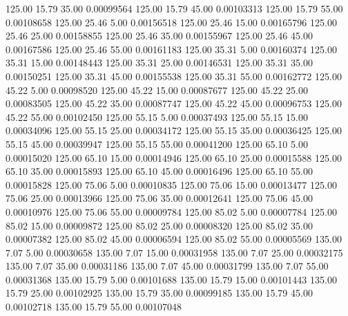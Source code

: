     125.00     15.79     35.00     0.00099564
    125.00     15.79     45.00     0.00103313
    125.00     15.79     55.00     0.00108658
    125.00     25.46      5.00     0.00156518
    125.00     25.46     15.00     0.00165796
    125.00     25.46     25.00     0.00158855
    125.00     25.46     35.00     0.00155967
    125.00     25.46     45.00     0.00167586
    125.00     25.46     55.00     0.00161183
    125.00     35.31      5.00     0.00160374
    125.00     35.31     15.00     0.00148443
    125.00     35.31     25.00     0.00146531
    125.00     35.31     35.00     0.00150251
    125.00     35.31     45.00     0.00155538
    125.00     35.31     55.00     0.00162772
    125.00     45.22      5.00     0.00098520
    125.00     45.22     15.00     0.00087677
    125.00     45.22     25.00     0.00083505
    125.00     45.22     35.00     0.00087747
    125.00     45.22     45.00     0.00096753
    125.00     45.22     55.00     0.00102450
    125.00     55.15      5.00     0.00037493
    125.00     55.15     15.00     0.00034096
    125.00     55.15     25.00     0.00034172
    125.00     55.15     35.00     0.00036425
    125.00     55.15     45.00     0.00039947
    125.00     55.15     55.00     0.00041200
    125.00     65.10      5.00     0.00015020
    125.00     65.10     15.00     0.00014946
    125.00     65.10     25.00     0.00015588
    125.00     65.10     35.00     0.00015893
    125.00     65.10     45.00     0.00016496
    125.00     65.10     55.00     0.00015828
    125.00     75.06      5.00     0.00010835
    125.00     75.06     15.00     0.00013477
    125.00     75.06     25.00     0.00013966
    125.00     75.06     35.00     0.00012641
    125.00     75.06     45.00     0.00010976
    125.00     75.06     55.00     0.00009784
    125.00     85.02      5.00     0.00007784
    125.00     85.02     15.00     0.00009872
    125.00     85.02     25.00     0.00008320
    125.00     85.02     35.00     0.00007382
    125.00     85.02     45.00     0.00006594
    125.00     85.02     55.00     0.00005569
    135.00      7.07      5.00     0.00030658
    135.00      7.07     15.00     0.00031958
    135.00      7.07     25.00     0.00032175
    135.00      7.07     35.00     0.00031186
    135.00      7.07     45.00     0.00031799
    135.00      7.07     55.00     0.00031368
    135.00     15.79      5.00     0.00101688
    135.00     15.79     15.00     0.00101443
    135.00     15.79     25.00     0.00102925
    135.00     15.79     35.00     0.00099185
    135.00     15.79     45.00     0.00102718
    135.00     15.79     55.00     0.00107048
